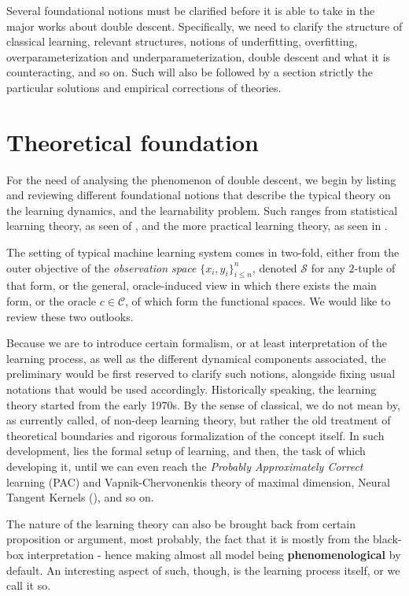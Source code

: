 \documentclass[
  journal=largetwo,
  year=2025,
  volume=37,
]{cup-journal}
\begin{document}

Several foundational notions must be clarified before it is able to take in the major works about double descent. Specifically, we need to clarify the structure of classical learning, relevant structures, notions of underfitting, overfitting, overparameterization and underparameterization, double descent and what it is counteracting, and so on. Such will also be followed by a section strictly the particular solutions and empirical corrections of theories. 

\section{Theoretical foundation}

For the need of analysing the phenomenon of double descent, we begin by listing and reviewing different foundational notions that describe the typical theory on the learning dynamics, and the learnability problem. Such ranges from statistical learning theory, as seen of \cite{Vapnik1999-VAPTNO,STL_Hajek_Maxim_2021,10.5555/2371238}, and the more practical learning theory, as seen in \cite{James2021}. 

The setting of typical machine learning system comes in two-fold, either from the outer objective of the \textit{observation space} $\{x_{i},y_{i}\}_{i\leq n}^{n}$, denoted $\mathcal{S}$ for any $2$-tuple of that form, or the general, oracle-induced view in which there exists the main form, or the oracle $c\in\mathcal{C}$, of which form the functional spaces. We would like to review these two outlooks.

Because we are to introduce certain formalism, or at least interpretation of the learning process, as well as the different dynamical components associated, the preliminary would be first reserved to clarify such notions, alongside fixing usual notations that would be used accordingly. Historically speaking, the learning theory started from the early 1970s. By the sense of classical, we do not mean by, as currently called, of non-deep learning theory, but rather the old treatment of theoretical boundaries and rigorous formalization of the concept itself. In such development, lies the formal setup of learning, and then, the task of which developing it, until we can even reach the \textit{Probably Approximately Correct} learning (PAC) and Vapnik-Chervonenkis theory of maximal dimension, Neural Tangent Kernels (\cite{Jacot:2018:NTK}), and so on.  

The nature of the learning theory can also be brought back from certain proposition or argument, most probably, the fact that it is mostly from the black-box interpretation - hence making almost all model being \textbf{phenomenological} by default. An interesting aspect of such, though, is the learning process itself, or we call it so. 
\end{document}
